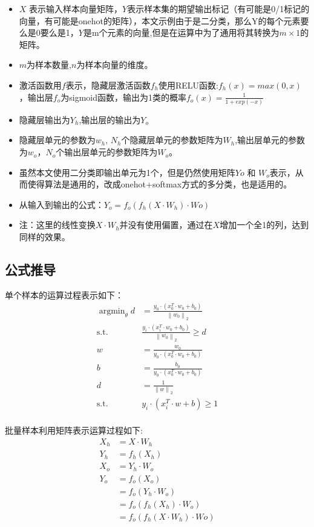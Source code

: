 \documentclass[12pt, a4paper, oneside]{ctexart}
\begin{document}
\begin{itemize}
\item $X$ 表示输入样本向量矩阵，$Y$表示样本集的期望输出标记（有可能是0/1标记的向量，有可能是onehot的矩阵），本文示例由于是二分类，那么Y的每个元素要么是0要么是1，$Y$是m个元素的向量,但是在运算中为了通用将其转换为$m\times 1$的矩阵。
\item $m$为样本数量,$n$为样本向量的维度。
\item 激活函数用$f$表示，隐藏层激活函数$f_h$使用RELU函数:$f_h(x) = max(0, x)$，输出层$f_o$为sigmoid函数，输出为1类的概率$f_o(x) = \frac{1}{1+exp(-x)}$
\item 隐藏层输出为$Y_h$,输出层的输出为$Y_o$
\item 隐藏层单元的参数为$w_h$, $N_h$个隐藏层单元的参数矩阵为$W_h$,输出层单元的参数为$w_o$，$N_o$个输出层单元的参数矩阵为$W_o$。
\item 虽然本文使用二分类即输出单元为1个，但是仍然使用矩阵$Yo $ 和 $ W_o$表示，从而使得算法是通用的，改成onehot+softmax方式的多分类，也是适用的。
\item 从输入到输出的公式：$Y_o = f_o(f_h(X \cdot W_h) \cdot Wo)$
\item 注：这里的线性变换$X \cdot W_h$并没有使用偏置，通过在$X$增加一个全1的列，达到同样的效果。
\end{itemize}


\subsection{公式推导}
单个样本的运算过程表示如下：
\begin{align*}
    \mathop{\arg\min}_{\theta}d &= \frac{y_0 \cdot (x_0^T \cdot w_0 + b_0)}{ \left\|w_0\right\|_2} 			\nonumber\\
	\mathrm{ s.t. }\ \   &\frac{y_i \cdot (x_i^T \cdot w_0 + b_0)}{ \left\|w_0\right\|_2} \geq d				\nonumber\\
	w &= \frac{w_0 }{ y_0 \cdot (x_0^T \cdot w_0 + b_0)} 			\nonumber\\
    b &= \frac{b_0 }{ y_0 \cdot (x_0^T \cdot w_0 + b_0)} 			\nonumber\\
	d &= \frac{1}{ \left\|w\right\|_2} 			\nonumber\\
	\mathrm{ s.t. }\ \   &y_i \cdot (x_i^T \cdot w + b) \geq 1				\nonumber\\
\end{align*}

批量样本利用矩阵表示运算过程如下:
\begin{align}
	X_h  &= X \cdot W_h 							\nonumber\\
	Y_h  &= f_h(X_h) 								\nonumber\\
	X_o  &= Y_h \cdot W_o 							\nonumber\\
    Y_o  &= f_o(X_o) 								\nonumber\\
    	 &= f_o(Y_h \cdot W_o) 					    \nonumber\\
    	 &= f_o(f_h(X_h) \cdot W_o) 				\nonumber\\
         &= f_o(f_h(X \cdot W_h) \cdot Wo)          \label{eq1}
\end{align}
\end{document}
